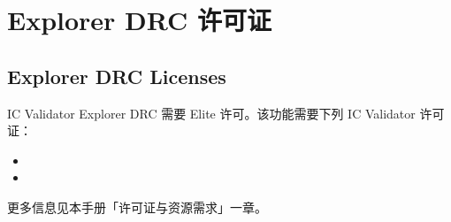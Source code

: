 \section{Explorer DRC 许可证}
\subsection*{Explorer DRC Licenses}

IC Validator Explorer DRC 需要 Elite 许可。该功能需要下列 IC Validator 许可证：
\begin{itemize}
  \item {}
  \item {}
\end{itemize}

\begin{seeAlsoBox}
更多信息见本手册「许可证与资源需求」一章。
\end{seeAlsoBox}
